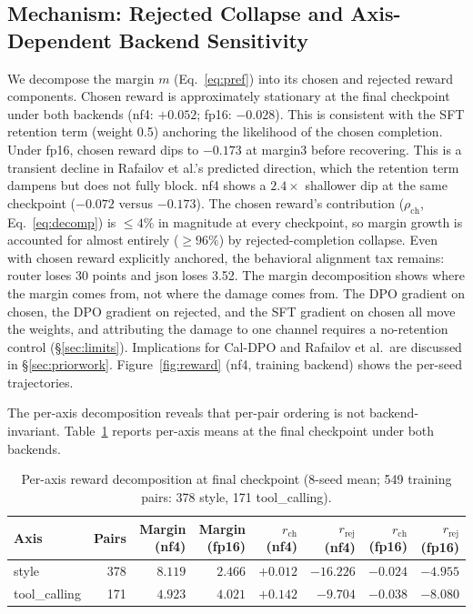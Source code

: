 \documentclass{article}
\begin{document}
\subsection{Mechanism: Rejected Collapse and Axis-Dependent Backend Sensitivity}
\label{sec:mechanism}
We decompose the margin $m$ (Eq.~\eqref{eq:pref}) into its chosen and rejected reward components. Chosen reward is approximately stationary at the final checkpoint under both backends (nf4: $+0.052$; fp16: $-0.028$). This is consistent with the SFT retention term (weight 0.5) anchoring the likelihood of the chosen completion. Under fp16, chosen reward dips to $-0.173$ at margin3 before recovering. This is a transient decline in Rafailov et al.'s predicted direction, which the retention term dampens but does not fully block. nf4 shows a $2.4\times$ shallower dip at the same checkpoint ($-0.072$ versus $-0.173$). The chosen reward's contribution ($\rho_{\text{ch}}$, Eq.~\eqref{eq:decomp}) is $\le4\%$ in magnitude at every checkpoint, so margin growth is accounted for almost entirely (${\geq}96\%$) by rejected-completion collapse. Even with chosen reward explicitly anchored, the behavioral alignment tax remains: router loses 30 points and json loses 3.52. The margin decomposition shows where the margin comes from, not where the damage comes from. The DPO gradient on chosen, the DPO gradient on rejected, and the SFT gradient on chosen all move the weights, and attributing the damage to one channel requires a no-retention control (\S\ref{sec:limits}). Implications for Cal-DPO and Rafailov et al.\ are discussed in \S\ref{sec:priorwork}. Figure~\ref{fig:reward} (nf4, training backend) shows the per-seed trajectories.

The per-axis decomposition reveals that per-pair ordering is not backend-invariant. Table~\ref{tab:peraxis} reports per-axis means at the final checkpoint under both backends.

\begin{table}[H]
\centering
\caption{Per-axis reward decomposition at final checkpoint (8-seed mean; 549 training pairs: 378 style, 171 tool\_calling).}
\label{tab:peraxis}
\small
\setlength{\tabcolsep}{4.5pt}
\begin{tabular}{@{}lrrrrrrr@{}}
\toprule
Axis & Pairs & Margin (nf4) & Margin (fp16) & $r_{\text{ch}}$ (nf4) & $r_{\text{rej}}$ (nf4) & $r_{\text{ch}}$ (fp16) & $r_{\text{rej}}$ (fp16)\\
\midrule
style & 378 & $8.119$ & $2.466$ & $+0.012$ & $-16.226$ & $-0.024$ & $-4.955$\\
tool\_calling & 171 & $4.923$ & $4.021$ & $+0.142$ & $-9.704$ & $-0.038$ & $-8.080$\\
\bottomrule
\end{tabular}
\end{table}
\end{document}

